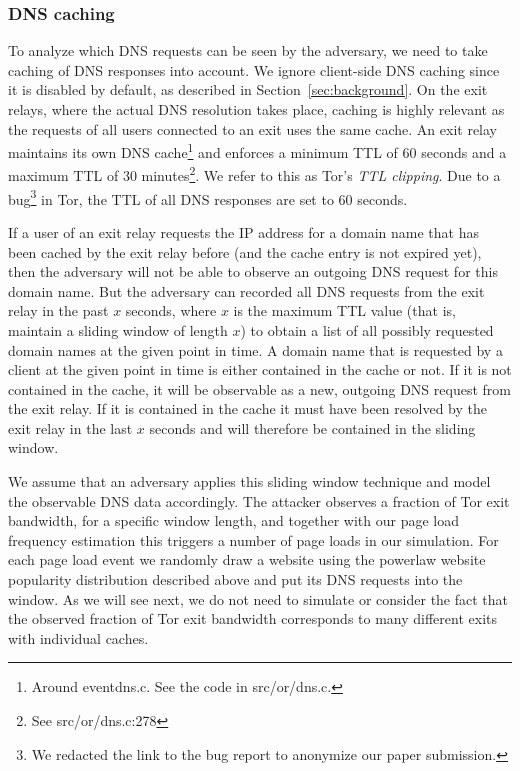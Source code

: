 \subsubsection{DNS caching}
To analyze which DNS requests can be seen by the adversary, we need to
take caching of DNS responses into account. We ignore client-side DNS
caching since it is disabled by default, as described in
Section~\ref{sec:background}.
On the exit relays, where the actual DNS resolution takes place, caching
is highly relevant as the requests of all users connected to an exit
uses the same cache. An exit
relay maintains its own DNS cache\footnote{Around eventdns.c.  See the
		code in src/or/dns.c.} and enforces a minimum TTL of 60 seconds
and a maximum TTL of 30 minutes\footnote{See src/or/dns.c:278}.  We
refer to this as Tor's \emph{TTL clipping}. Due to a
bug\footnote{We redacted the link to the bug report to anonymize our paper
submission.}
in Tor, the TTL of all DNS responses are set to 60 seconds.

If a user of an exit relay requests the IP address for a domain name
that has been cached by the exit relay before (and the cache entry is
not expired yet), then the adversary will not be able to observe an
outgoing DNS request for this domain name. But the adversary can
recorded all DNS requests from the exit relay in the past $x$ seconds,
where $x$ is the maximum TTL value (that is, maintain a sliding window of
length $x$) to obtain a list of all possibly requested domain names at the
given point in time. A domain name that is requested by a client at the
given point in time is either contained in the cache or not. If it is
not contained in the cache, it will be observable as a new, outgoing DNS
request from the exit relay. If it is contained in the cache it must
have been resolved by the exit relay in the last $x$ seconds and will
therefore be contained in the sliding window.

We assume that an adversary applies this sliding window technique and
model the observable DNS data accordingly.
The attacker observes a fraction of Tor exit bandwidth,
for a specific window length,
and together with our page load frequency estimation
this triggers a number of page loads in our simulation.
For each page load event we randomly draw a website using the
powerlaw website popularity distribution described above and put its
DNS requests into the window. As we will see next, we do not need to
simulate or consider the fact that the observed fraction of Tor exit bandwidth
corresponds to many different exits with individual caches.

